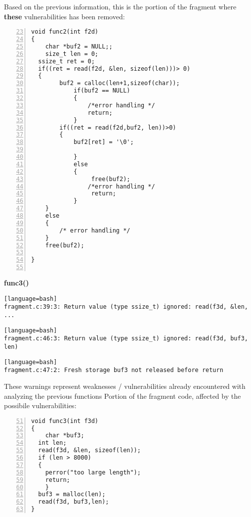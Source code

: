 \documentclass[a4paper,12pt]{article}
\begin{document}
\newpage
\noindent
Based on the previous information, this is the portion of the fragment where \textbf{these} vulnerabilities has been removed:
\begin{lstlisting}[style=c,numbers=left,firstnumber=23,linebackgroundcolor={
\ifnum\value{lstnumber}=28\color{green}\fi
\ifnum\value{lstnumber}=31\color{green}\fi
\ifnum\value{lstnumber}=36\color{green}\fi
\ifnum\value{lstnumber}=43\color{green}\fi
\ifnum\value{lstnumber}=52\color{green}\fi
}]
void func2(int f2d)
{
	char *buf2 = NULL;;
	size_t len = 0;
  ssize_t ret = 0;
  if((ret = read(f2d, &len, sizeof(len)))> 0)
  {
  		buf2 = calloc(len+1,sizeof(char));
			if(buf2 == NULL)
			{	
				/*error handling */
				return;
			} 
  		if((ret = read(f2d,buf2, len))>0)
  		{ 
  			buf2[ret] = '\0';
		  
			}
			else
			{
		 		 free(buf2);
		  		/*error handling */
		 		 return;
			}
	}
	else
	{
		/* error handling */
	}
	free(buf2);

}


\end{lstlisting}

\newpage
\noindent
\textbf{func3()}\\

   

\begin{lstlisting}[style=DOS][language=bash]
fragment.c:39:3: Return value (type ssize_t) ignored: read(f3d, &len, ...
\end{lstlisting}



\begin{lstlisting}[style=DOS][language=bash]
fragment.c:46:3: Return value (type ssize_t) ignored: read(f3d, buf3, len)
\end{lstlisting}


\begin{lstlisting}[style=DOS][language=bash]
fragment.c:47:2: Fresh storage buf3 not released before return
\end{lstlisting}
These warnings represent weaknesses / vulnerabilities already encountered with analyzing the previous functions
Portion of the fragment code, affected by the possibile vulnerabilities:
\begin{lstlisting}[style=c,numbers=left,firstnumber=51,linebackgroundcolor={
\ifnum\value{lstnumber}=55\color{red}\fi
\ifnum\value{lstnumber}=61\color{red}\fi
\ifnum\value{lstnumber}=62\color{red}\fi
}]
void func3(int f3d)
{
	char *buf3;
  int len;
  read(f3d, &len, sizeof(len));
  if (len > 8000) 
  { 
  	perror("too large length");
  	return; 
	}
  buf3 = malloc(len);
  read(f3d, buf3,len);        
}
\end{lstlisting}
\end{document}
